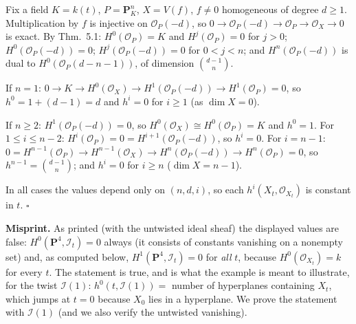 \documentclass[11pt]{article}
\begin{document}
Fix a field $K=k(t)$, $P=\mathbf P^n_K$, $X=V(f)$, $f\ne0$ homogeneous of degree $d\ge1$. Multiplication by $f$ is injective on $\mathcal O_P(-d)$, so $0\to\mathcal O_P(-d)\to\mathcal O_P\to\mathcal O_X\to0$ is exact. By Thm.~5.1: $H^0(\mathcal O_P)=K$ and $H^j(\mathcal O_P)=0$ for $j>0$; $H^0(\mathcal O_P(-d))=0$; $H^j(\mathcal O_P(-d))=0$ for $0<j<n$; and $H^n(\mathcal O_P(-d))$ is dual to $H^0(\mathcal O_P(d-n-1))$, of dimension $\binom{d-1}{n}$.

If $n=1$: $0\to K\to H^0(\mathcal O_X)\to H^1(\mathcal O_P(-d))\to H^1(\mathcal O_P)=0$, so $h^0=1+(d-1)=d$ and $h^i=0$ for $i\ge1$ (as $\dim X=0$).

If $n\ge2$: $H^1(\mathcal O_P(-d))=0$, so $H^0(\mathcal O_X)\cong H^0(\mathcal O_P)=K$ and $h^0=1$. For $1\le i\le n-2$: $H^i(\mathcal O_P)=0=H^{i+1}(\mathcal O_P(-d))$, so $h^i=0$. For $i=n-1$: $0=H^{n-1}(\mathcal O_P)\to H^{n-1}(\mathcal O_X)\to H^n(\mathcal O_P(-d))\to H^n(\mathcal O_P)=0$, so $h^{n-1}=\binom{d-1}{n}$; and $h^i=0$ for $i\ge n$ ($\dim X=n-1$).

In all cases the values depend only on $(n,d,i)$, so each $h^i(X_t,\mathcal O_{X_t})$ is constant in $t$. \hfill$\square$

\pf
\textbf{Misprint.} As printed (with the untwisted ideal sheaf) the displayed values are false: $H^0(\mathbf P^4,\mathcal I_t)=0$ always (it consists of constants vanishing on a nonempty set) and, as computed below, $H^1(\mathbf P^4,\mathcal I_t)=0$ for \emph{all} $t$, because $H^0(\mathcal O_{X_t})=k$ for every $t$. The statement is true, and is what the example is meant to illustrate, for the twist $\mathcal I(1)$: $h^0(t,\mathcal I(1))=$ number of hyperplanes containing $X_t$, which jumps at $t=0$ because $X_0$ lies in a hyperplane. We prove the statement with $\mathcal I(1)$ (and we also verify the untwisted vanishing).
\end{document}
